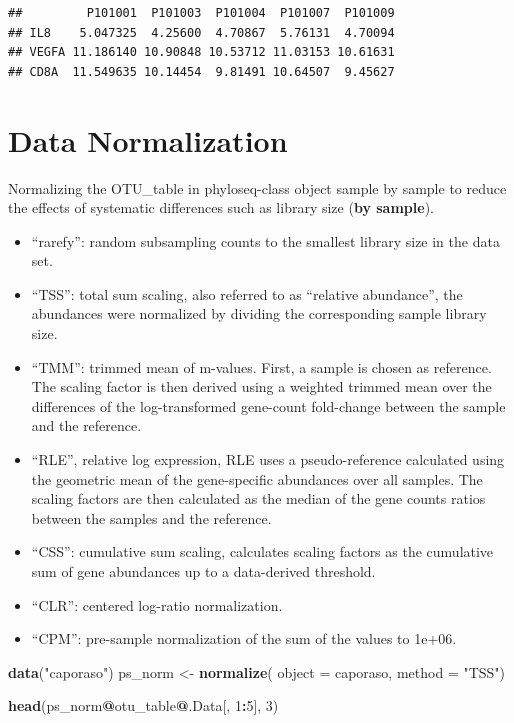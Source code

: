 \documentclass[
]{book}
\newenvironment{Shaded}{\begin{snugshade}}{\end{snugshade}}
\newcommand{\AttributeTok}[1]{\textcolor[rgb]{0.13,0.29,0.53}{#1}}
\newcommand{\DecValTok}[1]{\textcolor[rgb]{0.00,0.00,0.81}{#1}}
\newcommand{\FunctionTok}[1]{\textcolor[rgb]{0.13,0.29,0.53}{\textbf{#1}}}
\newcommand{\NormalTok}[1]{#1}
\newcommand{\OtherTok}[1]{\textcolor[rgb]{0.56,0.35,0.01}{#1}}
\newcommand{\SpecialCharTok}[1]{\textcolor[rgb]{0.81,0.36,0.00}{\textbf{#1}}}
\newcommand{\StringTok}[1]{\textcolor[rgb]{0.31,0.60,0.02}{#1}}
\begin{document}
\begin{verbatim}
##         P101001  P101003  P101004  P101007  P101009
## IL8    5.047325  4.25600  4.70867  5.76131  4.70094
## VEGFA 11.186140 10.90848 10.53712 11.03153 10.61631
## CD8A  11.549635 10.14454  9.81491 10.64507  9.45627
\end{verbatim}

\hypertarget{data-normalization}{%
\section{Data Normalization}\label{data-normalization}}

Normalizing the OTU\_table in phyloseq-class object sample by sample to reduce the effects of systematic differences such as library size (\textbf{by sample}).

\begin{itemize}
\item
  ``rarefy'': random subsampling counts to the smallest library size in the data set.
\item
  ``TSS'': total sum scaling, also referred to as ``relative abundance'', the abundances were normalized by dividing the corresponding sample library size.
\item
  ``TMM'': trimmed mean of m-values. First, a sample is chosen as reference. The scaling factor is then derived using a weighted trimmed mean over the differences of the log-transformed gene-count fold-change between the sample and the reference.
\item
  ``RLE'', relative log expression, RLE uses a pseudo-reference calculated using the geometric mean of the gene-specific abundances over all samples. The scaling factors are then calculated as the median of the gene counts ratios between the samples and the reference.
\item
  ``CSS'': cumulative sum scaling, calculates scaling factors as the cumulative sum of gene abundances up to a data-derived threshold.
\item
  ``CLR'': centered log-ratio normalization.
\item
  ``CPM'': pre-sample normalization of the sum of the values to 1e+06.
\end{itemize}

\begin{Shaded}
\begin{Highlighting}[]
\FunctionTok{data}\NormalTok{(}\StringTok{"caporaso"}\NormalTok{)}
\NormalTok{ps\_norm }\OtherTok{\textless{}{-}} \FunctionTok{normalize}\NormalTok{(}
    \AttributeTok{object =}\NormalTok{ caporaso,}
    \AttributeTok{method =} \StringTok{"TSS"}\NormalTok{)}

\FunctionTok{head}\NormalTok{(ps\_norm}\SpecialCharTok{@}\NormalTok{otu\_table}\SpecialCharTok{@}\NormalTok{.Data[, }\DecValTok{1}\SpecialCharTok{:}\DecValTok{5}\NormalTok{], }\DecValTok{3}\NormalTok{)}
\end{Highlighting}
\end{Shaded}
\end{document}
